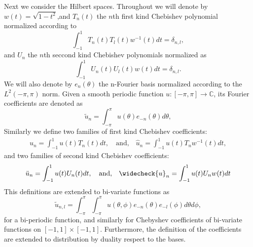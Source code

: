 \documentclass{article}
\newcommand{\IC}{{\mathbb C}}
\begin{document}
Next we consider the Hilbert spaces. Throughout we will denote by $w(t) = \sqrt{1-t^2}$,and $T_n(t)$ the $n$th first kind Chebishev polynomial normalized according to $$\int_{-1}^1 T_n(t) T_l(t) w^{-1}(t) dt = \delta_{n,l},$$ and $U_n$ the $n$th seccond kind Chebishev polynomials normalized as 
$$\int_{-1}^1 U_n(t) U_l(t) w(t) dt = \delta_{n,l}.$$
 We will also denote by $e_n(\theta)$ the n-Fourier basis normalized according to the $L^2(-\pi,\pi)$ norm. 
Given a smooth periodic function $u :[-\pi,\pi] \rightarrow \IC$, its Fourier coefficients are denoted as
$$
\widetilde{u}_n = \int_{-\pi}^\pi u(\theta) e_{-n}(\theta) d\theta, 
$$
Similarly we define two families of first kind Chebishev coefficients:
\begin{align*}
u_n = \int_{-1}^{1} u(t) T_n(t) dt, \quad \text{and,} \quad  \widehat{u}_n = \int_{-1}^1 u(t) T_n w^{-1}(t)dt, 
\end{align*}
and two families of second kind Chebishev coefficients:
\begin{align*}
\ddot{u}_n = \int_{-1}^1 u(t) U_n (t) dt,\quad \text{and,}\quad \widecheck{u} _n = \int_{-1}^1 u(t) U_n w(t) dt
\end{align*}
This definitions are extended to bi-variate functions as 
$$\widetilde{u}_{n,l} = \int_{-\pi}^{\pi}\int_{-\pi}^\pi u(\theta,\phi) e_{-n}(\theta)e_{-l}(\phi) d\theta d\phi,$$
for a bi-periodic function, and similarly  for Chebyshev coefficients of  bi-variate functions on $[-1,1]\times[-1,1]$. Furthermore, the definition of the coefficients are extended to distribution by duality respect to the bases. 
\end{document}
